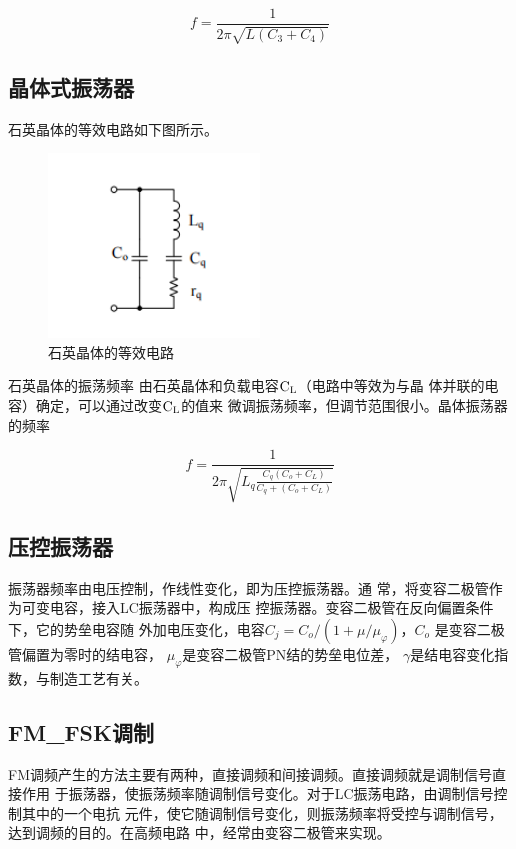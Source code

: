 \documentclass{../source/Experiment}
\begin{document}
        $$
        f = \frac{1}{2\pi\sqrt{L(C_3+C_4)}}
        $$


        \subsection{晶体式振荡器}
        石英晶体的等效电路如下图所示。
        \begin{figure}[H]
            \centering
            \includegraphics[width = 0.5\textwidth]{lab3/6.png}
            \caption{石英晶体的等效电路}    
        \end{figure}
        
        
        石英晶体的振荡频率
        由石英晶体和负载电容$\rm C_L$（电路中等效为与晶
        体并联的电容）确定，可以通过改变$\rm C_L$的值来
        微调振荡频率，但调节范围很小。晶体振荡器的频率

        $$
        f = \frac{1}{2\pi\sqrt{L_q\frac{C_q(C_o+C_L)}{C_q+(C_o+C_L)}}}
        $$

        \subsection{压控振荡器}
    振荡器频率由电压控制，作线性变化，即为压控振荡器。通
    常，将变容二极管作为可变电容，接入LC振荡器中，构成压
    控振荡器。变容二极管在反向偏置条件下，它的势垒电容随
    外加电压变化，电容$C_j = C_o/(1+\mu/\mu_{\varphi}
    )$，$C_o$ 是变容二极管偏置为零时的结电容， 
    $\mu_\varphi$是变容二极管PN结的势垒电位差，
    $\gamma$是结电容变化指数，与制造工艺有关。

        \subsection{FM\_FSK调制}
        FM调频产生的方法主要有两种，直接调频和间接调频。直接调频就是调制信号直接作用
        于振荡器，使振荡频率随调制信号变化。对于LC振荡电路，由调制信号控制其中的一个电抗
        元件，使它随调制信号变化，则振荡频率将受控与调制信号，达到调频的目的。在高频电路
        中，经常由变容二极管来实现。
\end{document}
